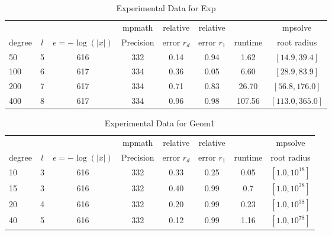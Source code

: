 \documentclass[sigconf]{acmart}
\begin{document}
\begin{table}[t]
\caption{Experimental Data for Exp}
\label{tab:exp}
\vskip -0.15in
\begin{center}
\begin{small}
\begin{sc}
\begin{tabular}{lccccccc}
\toprule
&  &  & mpmath & relative  & relative &  & mpsolve \\
degree  & $l$& $e=-\log(|x|)$& Precision &error $r_d$       & error $r_1$ &runtime& root radius\\
\midrule
   50 & 5 & 616 & 332 & 0.14 & 0.94 & 1.62 & $[14.9, 39.4]$ \\
 100 & 6 & 617 & 334 & 0.36 & 0.05 & 6.60 & $[28.9, 83.9]$\\
 200 & 7 & 617 & 334 & 0.71 & 0.83 & 26.70 & $[56.8, 176.0]$\\
 400 & 8 & 617 & 334 & 0.96 & 0.98 & 107.56 & $[113.0, 365.0]$\\
\bottomrule
\end{tabular}
\end{sc}
\end{small}
\end{center}
\vskip 0.05in
\end{table}

\begin{table}[t]
\caption{Experimental Data for Geom1}
\label{tab:geom1}
\vskip -0.15in
\begin{center}
\begin{small}
\begin{sc}
\begin{tabular}{lccccccc}
\toprule
&  &  & mpmath & relative  & relative &  & mpsolve \\
degree  & $l$& $e=-\log(|x|)$& Precision &error $r_d$       & error $r_1$ &runtime& root radius\\
\midrule
   10 & 3 & 616 & 332 & 0.33 & 0.25 & 0.05 & $[1.0, 10^{18}]$ \\
   15 & 3 & 616 & 332 & 0.40 & 0.99 & 0.7 & $[1.0, 10^{28}]$\\
   20 & 4 & 616 & 332 & 0.20 & 0.99 & 0.23 & $[1.0, 10^{38}]$\\
   40 & 5 & 616 & 332 & 0.12 & 0.99 & 1.16 & $[1.0, 10^{78}]$\\
\bottomrule
\end{tabular}
\end{sc}
\end{small}
\end{center}
\vskip 0.05in
\end{table}
\end{document}
